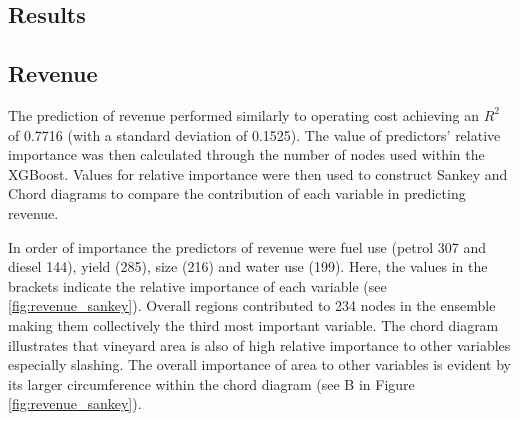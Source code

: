 \documentclass[review,12pt,authoryear]{elsarticle}
\begin{document}
\begin{linenumbers}
\section{Results}


\subsection{Revenue}

 
The prediction of revenue performed similarly to operating cost achieving an $R^2$ of 0.7716 (with a standard deviation of 0.1525). The value of predictors' relative importance was then calculated through the number of nodes used within the XGBoost. Values for relative importance were then used to construct Sankey and Chord diagrams to compare the contribution of each variable in predicting revenue.
\par
In order of importance the predictors of revenue were fuel use (petrol 307 and diesel 144), yield (285), size (216) and water use (199). Here, the values in the brackets indicate the relative importance of each variable (see \ref{fig:revenue_sankey}). Overall regions contributed to 234 nodes in the ensemble making them collectively the third most important variable. The chord diagram illustrates that vineyard area is also of high relative importance to other variables especially slashing. The overall importance of area to other variables is evident by its larger circumference within the chord diagram (see B in Figure \ref{fig:revenue_sankey}).


\end{linenumbers}
\end{document}
